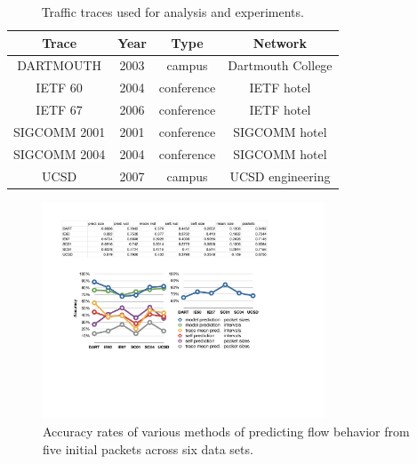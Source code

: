 \documentclass{acm_proc_article-sp}
\begin{document}
\begin{table}
\vspace{0.35em}
\begin{center}
\scriptsize
\begin{tabular}{|c|c|c|c|}

\hline
\textbf{Trace} &
\textbf{Year} &
\textbf{Type} &
\textbf{Network} \\
\hline

{\scriptsize{DARTMOUTH}} &
2003 &
campus &
Dartmouth College \\
\hline

{\scriptsize{IETF 60}} &
2004 &
conference &
IETF hotel \\
\hline

{\scriptsize{IETF 67}} &
2006 &
conference &
IETF hotel \\
\hline

{\scriptsize{SIGCOMM 2001}} &
2001 &
conference &
SIGCOMM hotel \\
\hline

{\scriptsize{SIGCOMM 2004}} &
2004 &
conference &
SIGCOMM hotel \\
\hline

{\scriptsize{UCSD}} &
2007 &
campus &
UCSD engineering \\
\hline

\end{tabular}
\caption{Traffic traces used for analysis and experiments.}
\end{center}
\vspace{-1em}
\end{table}

\begin{figure}[t]
\begin{center}
\includegraphics[width=3.3in]{pred_stats}
\caption{Accuracy rates of various methods of predicting flow behavior from five initial packets across six data sets.}
\end{center}
\vspace{-2em}
\end{figure}
\end{document}
